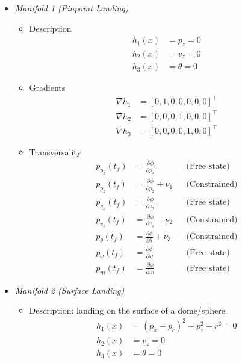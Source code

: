 \documentclass[letterpaper, 10 pt, conference]{ieeeconf}
\begin{document}
\begin{itemize}
    \item \textit{Manifold 1 (Pinpoint Landing)}

    \begin{itemize}
        \item Description
        \[
        \begin{aligned}
        h_1(x) &= p_z = 0 \\
        h_2(x) &= v_z = 0 \\
        h_3(x) &= \theta = 0
        \end{aligned}
        \]

        \item Gradients
        \[
        \begin{aligned}
        \nabla h_1 &= [0, 1, 0, 0, 0, 0, 0]^\top \\
        \nabla h_2 &= [0, 0, 0, 1, 0, 0, 0]^\top \\
        \nabla h_3 &= [0, 0, 0, 0, 1, 0, 0]^\top
        \end{aligned}
        \]

        \item Transversality
        \[
        \begin{aligned}
        p_{p_x}(t_f) &= \frac{\partial \phi}{\partial p_x} && \text{(Free state)} \\
        p_{p_z}(t_f) &= \frac{\partial \phi}{\partial p_z} + \nu_1 && \text{(Constrained)} \\
        p_{v_x}(t_f) &= \frac{\partial \phi}{\partial v_x} && \text{(Free state)} \\
        p_{v_z}(t_f) &= \frac{\partial \phi}{\partial v_z} + \nu_2 && \text{(Constrained)} \\
        p_{\theta}(t_f) &= \frac{\partial \phi}{\partial \theta} + \nu_3 && \text{(Constrained)} \\
        p_{\omega}(t_f) &= \frac{\partial \phi}{\partial \omega} && \text{(Free state)} \\
        p_{m}(t_f) &= \frac{\partial \phi}{\partial m} && \text{(Free state)}
        \end{aligned}
        \]
        \end{itemize}
 
    \item \textit{Manifold 2 (Surface Landing)}

        \begin{itemize}
            \item Description: landing on the surface of a dome/sphere.
            \[
            \begin{aligned}
            h_1(x) &= (p_x - p_c)^2 + p_z^2 - r^2 = 0 \\
            h_2(x) &= v_z = 0 \\
            h_3(x) &= \theta = 0
            \end{aligned}
            \]


\end{itemize}
\end{itemize}
\end{document}

